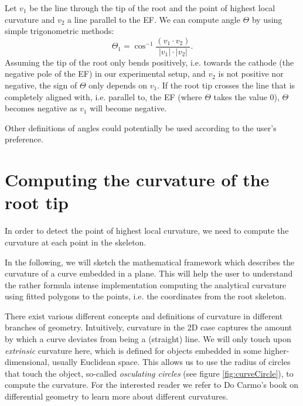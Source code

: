 

Let \( v_{1} \) be the line through the tip of the root and the point of highest local curvature and \(v_{2} \) a line parallel to the EF. 
We can compute angle \( \Theta \)  by using simple trigonometric methods:
\begin{equation} \label{angle1}
\Theta_{1}  = \cos^{-1}\frac{( v_{1} \cdot v_{2}) }{ | v_{1} | \cdot | v_{2} |}.
\end{equation}
Assuming the tip of the root only bends positively, i.e. towards the cathode (the negative pole of the EF) in our experimental setup, and \( v_{2} \) is not positive nor negative, the sign of \(\Theta \) only depends on \( v_{1} \). If the root tip crosses the line that is completely aligned with, i.e. parallel to, the EF (where \( \Theta \) takes the value 0), \( \Theta \) becomes negative as \( v_{1} \) will become negative. 

Other definitions of angles \cite{french2009high,de2012validity} could potentially be used according to the user's preference. 


\section{Computing the curvature of the root tip}


In order to detect the point of highest local curvature, we need to compute the curvature at each point in the skeleton. 


In the following, we will sketch the mathematical framework which describes the curvature of a curve embedded in a plane.
This will help the user to understand the rather formula intense implementation computing the analytical curvature using fitted polygons to the points, i.e. the coordinates from the root skeleton.

There exist various different concepts and definitions of curvature in different branches of geometry.
Intuitively, curvature in the 2D case captures the amount by which a curve deviates from being a (straight) line.
We will only touch upon \textit{extrinsic} curvature here, which is defined for objects embedded in some higher-dimensional, usually Euclidean space. This allows us to use the radius of circles that touch the object, so-called \textit{osculating circles} (see figure \ref{fig:curveCircle}), to compute the curvature. 
For the interested reader we refer to Do Carmo's book on differential geometry \cite{do2016differential} to learn more about different curvatures.

